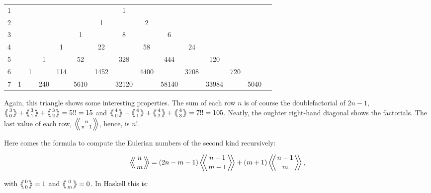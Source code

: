 \documentclass{scrreprt}
\begin{document}
\begin{tabular}{l c c c c c c c c c c c c c c}
1 &   &    &    &    &    &     &  1  &     &     &    &     &    &    &   \\
2 &   &    &    &    &    &   1 &     &   2 &     &    &     &    &    &   \\
3 &   &    &    &    &  1 &     &  8  &     &  6  &    &     &    &    &   \\
4 &   &    &    &  1 &    &  22 &     &  58 &     & 24 &     &    &    &   \\
5 &   &    &  1 &    & 52 &     &328  &     &444  &    & 120 &    &    &   \\
6 &   &  1 &    &114 &    &1452 &     &4400 &     &3708&     &720 &    &   \\   
7 & 1 &    &240 &    &5610&     &32120&     &58140&    &33984&    &5040&   
\end{tabular}

Again, this triangle shows some interesting
properties. The sum of each row $n$ is of course
the doublefactorial of $2n-1$, \eg\
$\eulerianTwo{3}{0} + \eulerianTwo{3}{1} + \eulerianTwo{3}{2} = 5!! = 15$ and
$\eulerianTwo{4}{0} + \eulerianTwo{4}{1} + \eulerianTwo{4}{2} + \eulerianTwo{4}{3} =
7!! = 105$.
Neatly, the oughter right-hand diagonal
shows the factorials. The last value of each row,
$\left\langle\!\!\left\langle{n \atop n-1}\right\rangle\!\!\right\rangle$, hence, is $n!$.

Here comes the formula to compute the Eulerian numbers
of the second kind recursively:

\begin{equation}
\eulerianTwo{n}{m} = (2n-m-1) \eulerianTwo{n-1}{m-1} 
                   + (m+1)    \eulerianTwo{n-1}{m}, 
\end{equation}

with $\left\langle\!\!\left\langle{0 \atop 0}\right\rangle\!\!\right\rangle = 1$ and $\left\langle\!\!\left\langle{0 \atop m}\right\rangle\!\!\right\rangle = 0$.
In Haskell this is:
\end{document}
